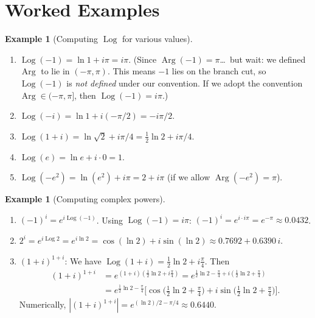 \documentclass[12pt,a4paper,openany]{book}
\theoremstyle{definition}
\newtheorem{example}[definition]{Example}
\theoremstyle{plain}
\theoremstyle{remark}
\DeclareMathOperator{\Arg}{Arg}
\DeclareMathOperator{\Log}{Log}
\newcommand{\abs}[1]{\left|#1\right|}
\begin{document}
\section{Worked Examples}
\label{sec:ch3-examples}

\begin{example}[Computing $\Log$ for various values]\label{ex:log-values}
\leavevmode
\begin{enumerate}[label=\textup{(\alph*)}]
  \item $\Log(-1) = \ln 1 + i\pi = i\pi$.  (Since $\Arg(-1) = \pi$\ldots\
    but wait: we defined $\Arg$ to lie in $(-\pi,\pi)$.  This means $-1$ lies
    on the branch cut, so $\Log(-1)$ is \emph{not defined} under our convention.
    If we adopt the convention $\Arg\in(-\pi,\pi]$, then $\Log(-1)=i\pi$.)
  \item $\Log(-i) = \ln 1 + i(-\pi/2) = -i\pi/2$.
  \item $\Log(1+i) = \ln\sqrt{2} + i\pi/4 = \tfrac{1}{2}\ln 2 + i\pi/4$.
  \item $\Log(e) = \ln e + i\cdot 0 = 1$.
  \item $\Log(-e^2) = \ln(e^2) + i\pi = 2 + i\pi$
    (if we allow $\Arg(-e^2) = \pi$).
\end{enumerate}
\end{example}

\begin{example}[Computing complex powers]\label{ex:complex-powers-computed}
\leavevmode
\begin{enumerate}[label=\textup{(\alph*)}]
  \item $(-1)^i = e^{i\Log(-1)}$.  Using $\Log(-1)=i\pi$:
    $(-1)^i = e^{i\cdot i\pi} = e^{-\pi}\approx 0.0432$.
  \item $2^i = e^{i\Log 2} = e^{i\ln 2} = \cos(\ln 2)+i\sin(\ln 2)
    \approx 0.7692 + 0.6390\,i$.
  \item $(1+i)^{1+i}$: We have $\Log(1+i) = \frac{1}{2}\ln 2 + i\frac{\pi}{4}$.
    Then
    \begin{align*}
      (1+i)^{1+i} &= e^{(1+i)(\frac{1}{2}\ln 2+i\frac{\pi}{4})}
      = e^{\frac{1}{2}\ln 2-\frac{\pi}{4}+i(\frac{1}{2}\ln 2+\frac{\pi}{4})} \\
      &= e^{\frac{1}{2}\ln 2-\frac{\pi}{4}}\bigl[\cos\bigl(\tfrac{1}{2}\ln 2
        +\tfrac{\pi}{4}\bigr)+i\sin\bigl(\tfrac{1}{2}\ln 2+\tfrac{\pi}{4}\bigr)\bigr].
    \end{align*}
    Numerically, $\abs{(1+i)^{1+i}} = e^{(\ln 2)/2-\pi/4}\approx 0.6440$.
\end{enumerate}
\end{example}
\end{document}

